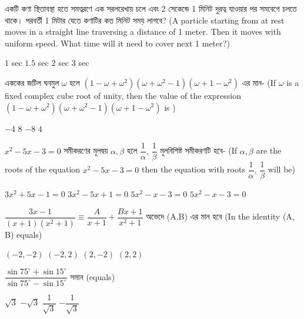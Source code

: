 \documentclass[addpoints]{exam}
\begin{document}
\begin{questions}
\question  একটি কণা স্থিতাবস্থা হতে সমত্বরণে এক সরলরেখায় চলে এবং 2 সেকেন্ডে 1 মিনিট দুরত্ব যাওয়ার পর সমবেগে চলতে থাকে। পরবর্তী 1 মিটার যেতে কণাটির কত মিনিট সময় লাগবে? (A particle starting from at rest moves in a straight line traversing a distance of 1 meter. Then it moves with uniform speed. What time will it need to cover next 1 meter?)


\begin{oneparchoices}
\choice $ 1 $ sec
\choice $ 1.5 $ sec
\choice $ 2 $ sec
\choice $ 3 $ sec
\end{oneparchoices}

\question এককের জটিল ঘনমুল $ \omega $ হলে $ (1-\omega+\omega^{2})(\omega + \omega^{2}-1)(\omega+1-\omega^{2}) $ এর মান- (If $ \omega $ is a fixed complex cube root of unity, then the value of the expression $ (1-\omega+\omega^{2})(\omega + \omega^{2}-1)(\omega+1-\omega^{2}) $ is ) 

\begin{oneparchoices}
\choice $ -4 $
\choice $ 8 $
\choice $ -8 $
\choice $ 4 $
\end{oneparchoices}


\question $ x^{2}-5x-3=0 $ সমীকরণের মূলদ্বয় $ \alpha, \beta $ হলে $ \dfrac{1}{\alpha},\,\dfrac{1}{\beta} $ মূলবিশিষ্ট সমীকরণটি হবে- (If $ \alpha, \beta $ are the roots of the equation $ x^{2}-5x-3=0 $ then the equation with roots $ \dfrac{1}{\alpha},\,\dfrac{1}{\beta} $ will be)

\begin{oneparchoices}
\choice $ 3x^{2}+5x-1=0 $
\choice $ 3x^{2}-5x+1=0 $
\choice $ 5x^{2}-x-3=0 $
\choice $ 5x^{2}-x-3=0 $
\end{oneparchoices}

\question  $ \dfrac{3x-1}{(x+1)(x^2 +1)} \equiv \dfrac{A}{x+1} + \dfrac{Bx+1}{x^2 +1} $  অভেদে (A,B) এর মান হবে (In the identity (A, B) equals)

\begin{oneparchoices}
\choice $ (-2,-2) $
\choice $ (-2, 2) $
\choice $ (2,-2) $
\choice  $ (2,2) $

\end{oneparchoices}

\question $ \dfrac{\sin 75^{\circ}+\sin 15^{\circ}}{\sin 75^{\circ}-\sin 15^{\circ}} $ সমান (equals)

\begin{oneparchoices}
\choice $ \sqrt{3} $
\choice $ -\sqrt{3} $
\choice $ \dfrac{1}{\sqrt{3}} $
\choice $ -\dfrac{1}{\sqrt{3}} $
\end{oneparchoices}


\end{questions}
\end{document}
